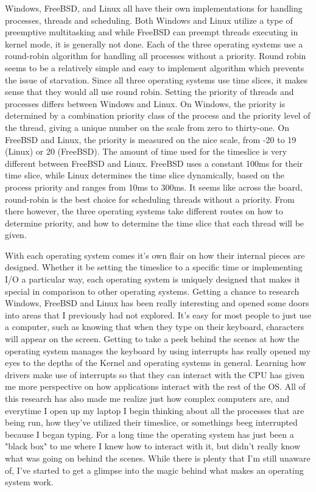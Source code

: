 \documentclass[letterpaper,10pt,draftclsnofoot,onecolumn,titlepage]{IEEEtran}
\begin{document}
	Windows, FreeBSD, and Linux all have their own implementations for handling processes, threads and scheduling.
	Both Windows and Linux utilize a type of preemptive multitasking and while FreeBSD can preempt threads executing in kernel mode, it is generally not done.
	Each of the three operating systems use a round-robin algorithm for handling all processes without a priority.
	Round robin seems to be a relatively simple and easy to implement algorithm which prevents the issue of starvation.
	Since all three operating systems use time slices, it makes sense that they would all use round robin.
	Setting the priority of threads and processes differs between Windows and Linux.
	On Windows, the priority is determined by a combination priority class of the process and the priority level of the thread, giving a unique number on the scale from zero to thirty-one.
	On FreeBSD and Linux, the priority is measured on the nice scale, from -20 to 19 (Linux) or 20 (FreeBSD).
	The amount of time used for the timeslice is very different between FreeBSD and Linux. FreeBSD uses a constant 100ms for their time slice, while Linux determines the time slice dynamically, based on the process priority and ranges from 10ms to 300ms.
	It seems like across the board, round-robin is the best choice for scheduling threads without a priority.
	From there however, the three operating systems take different routes on how to determine priority, and how to determine the time slice that each thread will be given.

	With each operating system comes it's own flair on how their internal pieces are designed.
	Whether it be setting the timeslice to a specific time or implementing I/O a particular way, each operating system is uniquely designed that makes it special in comparison to other operating systems.
	Getting a chance to research Windows, FreeBSD and Linux has been really interesting and opened some doors into areas that I previously had not explored.
	It's easy for most people to just use a computer, such as knowing that when they type on their keyboard, characters will appear on the screen.
	Getting to take a peek behind the scenes at how the operating system manages the keyboard by using interrupts has really opened my eyes to the depths of the Kernel and operating systems in general.
	Learning how drivers make use of interrupts so that they can interact with the CPU has given me more perspective on how applications interact with the rest of the OS.
	All of this research has also made me realize just how complex computers are, and everytime I open up my laptop I begin thinking about all the processes that are being run, how they've utilized their timeslice, or somethings beeg interrupted because I began typing.
	For a long time the operating system has just been a "black box" to me where I knew how to interact with it, but didn't really know what was going on behind the scenes.
	While there is plenty that I'm still unaware of, I've started to get a glimpse into the magic behind what makes an operating system work.
\end{document}
